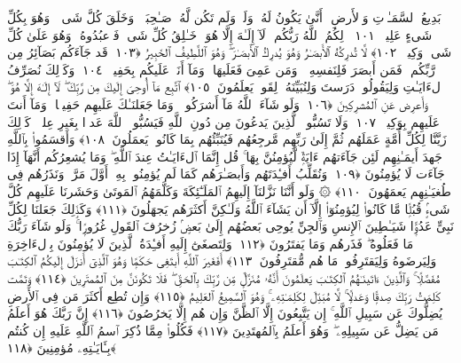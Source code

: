  بَدِيعُ ٱلسَّمَـٰوَٟتِ وَٱلأَرضِ ۖ أَنَّىٰ يَكُونُ لَهُۥ وَلَدٌۭ وَلَم تَكُن لَّهُۥ صَـٰحِبَةٌۭ ۖ وَخَلَقَ كُلَّ شَىءٍۢ ۖ وَهُوَ بِكُلِّ شَىءٍ عَلِيمٌۭ ﴿١٠١﴾
 ذَٟلِكُمُ ٱللَّهُ رَبُّكُم ۖ لَآ إِلَـٰهَ إِلَّا هُوَ ۖ خَـٰلِقُ كُلِّ شَىءٍۢ فَٱعبُدُوهُ ۚ وَهُوَ عَلَىٰ كُلِّ شَىءٍۢ وَكِيلٌۭ ﴿١٠٢﴾
 لَّا تُدرِكُهُ ٱلأَبصَـٰرُ وَهُوَ يُدرِكُ ٱلأَبصَـٰرَ ۖ وَهُوَ ٱللَّطِيفُ ٱلخَبِيرُ ﴿١٠٣﴾
 قَد جَآءَكُم بَصَآئِرُ مِن رَّبِّكُم ۖ فَمَن أَبصَرَ فَلِنَفسِهِۦ ۖ وَمَن عَمِىَ فَعَلَيهَا ۚ وَمَآ أَنَا۠ عَلَيكُم بِحَفِيظٍۢ ﴿١٠٤﴾
 وَكَذَٟلِكَ نُصَرِّفُ ٱلءَايَـٰتِ وَلِيَقُولُوا۟ دَرَستَ وَلِنُبَيِّنَهُۥ لِقَومٍۢ يَعلَمُونَ ﴿١٠٥﴾
 ٱتَّبِع مَآ أُوحِىَ إِلَيكَ مِن رَّبِّكَ ۖ لَآ إِلَـٰهَ إِلَّا هُوَ ۖ وَأَعرِض عَنِ ٱلمُشرِكِينَ ﴿١٠٦﴾
 وَلَو شَآءَ ٱللَّهُ مَآ أَشرَكُوا۟ ۗ وَمَا جَعَلنَـٰكَ عَلَيهِم حَفِيظًۭا ۖ وَمَآ أَنتَ عَلَيهِم بِوَكِيلٍۢ ﴿١٠٧﴾
 وَلَا تَسُبُّوا۟ ٱلَّذِينَ يَدعُونَ مِن دُونِ ٱللَّهِ فَيَسُبُّوا۟ ٱللَّهَ عَدوًۢا بِغَيرِ عِلمٍۢ ۗ كَذَٟلِكَ زَيَّنَّا لِكُلِّ أُمَّةٍ عَمَلَهُم ثُمَّ إِلَىٰ رَبِّهِم مَّرجِعُهُم فَيُنَبِّئُهُم بِمَا كَانُوا۟ يَعمَلُونَ ﴿١٠٨﴾
 وَأَقسَمُوا۟ بِٱللَّهِ جَهدَ أَيمَـٰنِهِم لَئِن جَآءَتهُم ءَايَةٌۭ لَّيُؤمِنُنَّ بِهَا ۚ قُل إِنَّمَا ٱلءَايَـٰتُ عِندَ ٱللَّهِ ۖ وَمَا يُشعِرُكُم أَنَّهَآ إِذَا جَآءَت لَا يُؤمِنُونَ ﴿١٠٩﴾
 وَنُقَلِّبُ أَفـِٔدَتَهُم وَأَبصَـٰرَهُم كَمَا لَم يُؤمِنُوا۟ بِهِۦٓ أَوَّلَ مَرَّةٍۢ وَنَذَرُهُم فِى طُغيَـٰنِهِم يَعمَهُونَ ﴿١١٠﴾
 ۞ وَلَو أَنَّنَا نَزَّلنَآ إِلَيهِمُ ٱلمَلَـٰٓئِكَةَ وَكَلَّمَهُمُ ٱلمَوتَىٰ وَحَشَرنَا عَلَيهِم كُلَّ شَىءٍۢ قُبُلًۭا مَّا كَانُوا۟ لِيُؤمِنُوٓا۟ إِلَّآ أَن يَشَآءَ ٱللَّهُ وَلَـٰكِنَّ أَكثَرَهُم يَجهَلُونَ ﴿١١١﴾
 وَكَذَٟلِكَ جَعَلنَا لِكُلِّ نَبِىٍّ عَدُوًّۭا شَيَـٰطِينَ ٱلإِنسِ وَٱلجِنِّ يُوحِى بَعضُهُم إِلَىٰ بَعضٍۢ زُخرُفَ ٱلقَولِ غُرُورًۭا ۚ وَلَو شَآءَ رَبُّكَ مَا فَعَلُوهُ ۖ فَذَرهُم وَمَا يَفتَرُونَ ﴿١١٢﴾
 وَلِتَصغَىٰٓ إِلَيهِ أَفـِٔدَةُ ٱلَّذِينَ لَا يُؤمِنُونَ بِٱلءَاخِرَةِ وَلِيَرضَوهُ وَلِيَقتَرِفُوا۟ مَا هُم مُّقتَرِفُونَ ﴿١١٣﴾
 أَفَغَيرَ ٱللَّهِ أَبتَغِى حَكَمًۭا وَهُوَ ٱلَّذِىٓ أَنزَلَ إِلَيكُمُ ٱلكِتَـٰبَ مُفَصَّلًۭا ۚ وَٱلَّذِينَ ءَاتَينَـٰهُمُ ٱلكِتَـٰبَ يَعلَمُونَ أَنَّهُۥ مُنَزَّلٌۭ مِّن رَّبِّكَ بِٱلحَقِّ ۖ فَلَا تَكُونَنَّ مِنَ ٱلمُمتَرِينَ ﴿١١٤﴾
 وَتَمَّت كَلِمَتُ رَبِّكَ صِدقًۭا وَعَدلًۭا ۚ لَّا مُبَدِّلَ لِكَلِمَـٰتِهِۦ ۚ وَهُوَ ٱلسَّمِيعُ ٱلعَلِيمُ ﴿١١٥﴾
 وَإِن تُطِع أَكثَرَ مَن فِى ٱلأَرضِ يُضِلُّوكَ عَن سَبِيلِ ٱللَّهِ ۚ إِن يَتَّبِعُونَ إِلَّا ٱلظَّنَّ وَإِن هُم إِلَّا يَخرُصُونَ ﴿١١٦﴾
 إِنَّ رَبَّكَ هُوَ أَعلَمُ مَن يَضِلُّ عَن سَبِيلِهِۦ ۖ وَهُوَ أَعلَمُ بِٱلمُهتَدِينَ ﴿١١٧﴾
 فَكُلُوا۟ مِمَّا ذُكِرَ ٱسمُ ٱللَّهِ عَلَيهِ إِن كُنتُم بِـَٔايَـٰتِهِۦ مُؤمِنِينَ ﴿١١٨﴾
